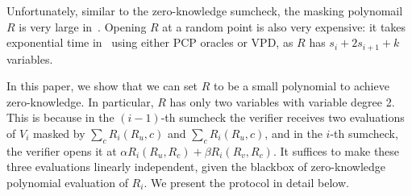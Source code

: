 Unfortunately, similar to the zero-knowledge sumcheck, the masking polynomail $R$ is very large in~\cite{zksumcheck}. Opening $R$ at a random point is also very expensive: it takes exponential time in~\cite{zksumcheck} using either PCP oracles or VPD, as $R$ has $s_i+2s_{i+1}+k$ variables.

In this paper, we show that we can set $R$ to be a small polynomial to achieve zero-knowledge. In particular, $R$ has only two variables with variable degree 2. This is because in the $(i-1)$-th sumcheck the verifier receives two evaluations of $V_i$ masked by $\sum_{c}R_i(R_u,c)$ and $\sum_{c}R_i(R_u,c)$, and in the $i$-th sumcheck, the verifier opens it at $\alpha R_i(R_u,R_c)+\beta R_i(R_v,R_c)$. It suffices to make these three evaluations linearly independent, given the blackbox of zero-knowledge polynomial evaluation of $R_i$. We present the protocol in detail below.



